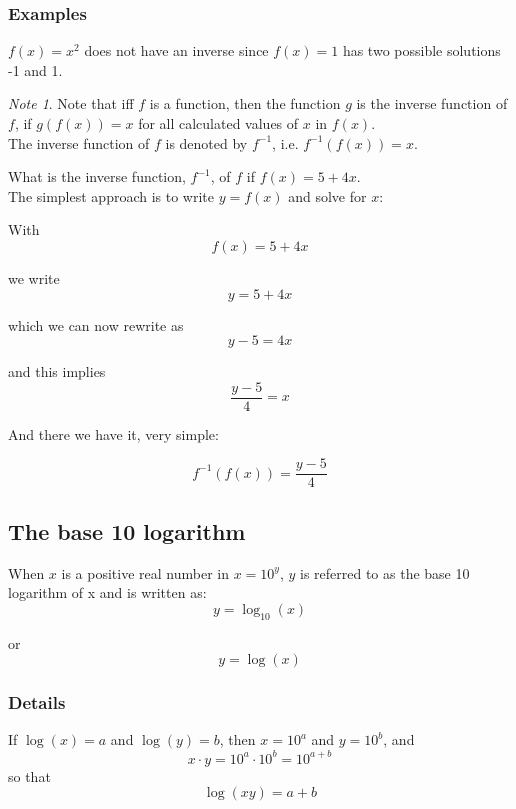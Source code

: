\documentclass[12pt,a4paper]{article}
\theoremstyle{regla}
\theoremstyle{remark}
\newtheorem{notes}{Note}[section]
\theoremstyle{definition}
\theoremstyle{nonumberbreak}
\begin{document}
\subsubsection{Examples}
\begin{xmpl}

$f(x)=x^2$ does not have an inverse since $f(x)=1$ has two possible solutions -1 and 1.


\end{xmpl}

\begin{notes}

Note that iff $f$ is a function, then the function $g$ is the inverse function of $f$, if $g(f(x)) = x$ for all calculated values of $x$ in $f(x)$.\\

The inverse function of $f$ is denoted by $f^{-1}$, i.e. $f^{-1}(f(x)) = x$. 
\end{notes}
\begin{xmpl}
What is the inverse function, $f^{-1}$, of $f$ if $f(x) = 5 + 4x$.\\

The simplest approach is to write $y=f(x)$ and solve for $x$:

With $$f(x) = 5 + 4x$$

we write $$y = 5 + 4x$$

which we can now rewrite as
$$y - 5 = 4x$$

and this implies  $$\frac{y-5}{4} = x $$

And there we have it, very simple: 

$$f^{-1}(f(x)) = \frac{y - 5}{4}$$
\end{xmpl}


\subsection{The base 10 logarithm}
\begin{fbox}
\begin{minipage}{0.97\textwidth}
When $x$ is a positive real number in $x=10^y$, $y$ is referred to as the base 10 logarithm of x and is written as: 
$$ y=\log_{10}(x) $$

or 
$$ y=\log(x) $$



\end{minipage}
\end{fbox}
\subsubsection{Details}
If $\log (x) = a$ and $\log (y)=b$, then $x = 10^a$ and $y = 10^b$, and
$$ x \cdot y = 10^a \cdot 10^b = 10^{a+b}$$
so that $$ \log(xy) = a+b $$
\end{document}
